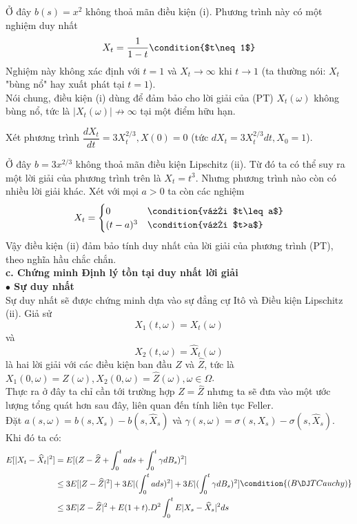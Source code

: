 \documentclass[a4paper]{article}
\numberwithin{equation}{section}
\begin{document}
Ở đây $b(s)=x^2$ không thoả mãn điều kiện (i). Phương trình này có một nghiệm duy nhất
\begin{equation*}
	X_t=\dfrac{1}{1-t} \condition{$t\neq 1$}
\end{equation*}
Nghiệm này không xác định với $t=1$ và $X_t\rightarrow\infty$ khi $t\rightarrow 1$ (ta thường nói: $X_t$ "bùng nổ" hay xuất phát tại $t=1$).\\
Nói chung, điều kiện (i) dùng để đảm bảo cho lời giải của (PT) $X_t(\omega)$ không bùng nổ, tức là $|X_t(\omega)|\not\to\infty$ tại một điểm hữu hạn.\\
\begin{example}
	Xét phương trình $\dfrac{dX_t}{dt}=3X^{2/3}_t,X(0)=0$ (tức $dX_t=3X^{2/3}_tdt,X_0=1$).
\end{example}
Ở đây $b=3x^{2/3}$ không thoả mãn điều kiện Lipschitz (ii). Từ đó ta có thể suy ra một lời giải của phương trình trên là $X_t=t^3$. Nhưng phương trình nào còn có nhiều lời giải khác. Xét với mọi $a>0$ ta còn các nghiệm
\begin{equation*}
	X_t=\begin{cases}
		0&\condition{với $t\leq a$}\\
		(t-a)^3&\condition{với $t>a$}
	\end{cases}
\end{equation*}
Vậy điều kiện (ii) đảm bảo tính duy nhất của lời giải của phương trình (PT), theo nghĩa hầu chắc chắn.\\
\indent\textbf{c. Chứng minh Định lý tồn tại duy nhất lời giải}\\
\textbf{$\bullet$ Sự duy nhất}\\
Sự duy nhất sẽ được chứng minh dựa vào sự đẳng cự Itô và Điều kiện Lipschitz (ii). Giả sử
\begin{equation*}
	X_1(t,\omega)=X_t(\omega)
\end{equation*}
và
\begin{equation*}
	X_2(t,\omega)=\widehat{X}_t(\omega)
\end{equation*}
là hai lời giải với các điều kiện ban đầu $Z$ và $\widehat{Z}$, tức là $X_1(0,\omega)=Z(\omega),X_2(0,\omega)=\widehat{Z}(\omega),\omega\in\Omega$.\\
Thực ra ở đây ta chỉ cần tới trường hợp $Z=\widehat{Z}$ nhưng ta sẽ đưa vào một ước lượng tổng quát hơn sau đây, liên quan đến tính liên tục Feller.\\
Đặt $a(s,\omega)=b(s,X_s)-b(s,\widehat{X}_s)$ và $\gamma(s,\omega)=\sigma(s,X_s)-\sigma(s,\widehat{X}_s)$. Khi đó ta có:
\begin{equation*}
\begin{split}
	E[|X_t-\widehat{X}_t|^2]&=E[(Z-\widehat{Z}+\int_0^tads+\int_0^t\gamma dB_s)^2]\\
&\leq 3E[|Z-\widehat{Z}|^2]+3E|(\int_0^tads)^2]+3E|(\int_0^t\gamma dB_s)^2]\\
&\leq 3E|Z-\widehat{Z}|^2+E(1+t).D^2\int_0^tE|X_s-\widehat{X}_s|^2ds
\end{split} \condition{(BĐT Cauchy)}
\end{equation*}
\end{document}
